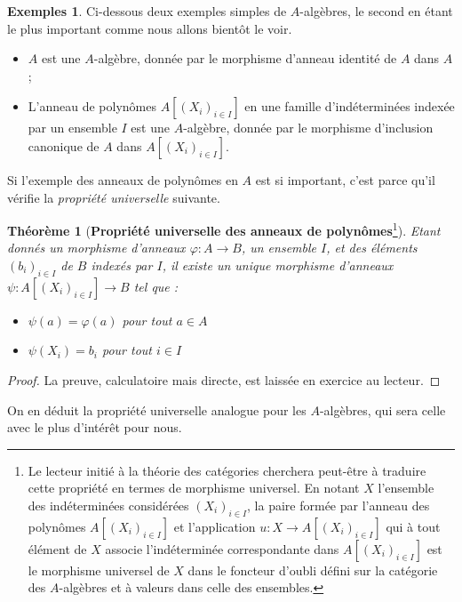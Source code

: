 \documentclass[10pt, twoside]{article}
\theoremstyle{plain}
\newtheorem{theorem}{Théorème}[section]
\theoremstyle{definition}
\theoremstyle{plain}
\theoremstyle{plain}
\theoremstyle{definition}
\newtheorem*{example}{Exemples}
\theoremstyle{remark}
\begin{document}
\begin{example} 
Ci-dessous deux exemples simples de $A$-algèbres, le second en étant le plus important comme nous allons bientôt le voir.
    \begin{itemize}
        \item $A$ est une $A$-algèbre, donnée par le morphisme d'anneau identité de $A$ dans $A$;
        \item L'anneau de polynômes $A[(X_i)_{i \in I}]$ en une famille d'indéterminées indexée par un ensemble $I$ est une $A$-algèbre, donnée par le morphisme d'inclusion canonique de $A$ dans $A[(X_i)_{i \in I}]$.
    \end{itemize}  
\end{example}

Si l'exemple des anneaux de polynômes en $A$ est si important, c'est parce qu'il vérifie la \textit{propriété universelle} suivante.

\begin{theorem}[\textbf{Propriété universelle des anneaux de polynômes}\footnote{Le lecteur initié à la théorie des catégories cherchera peut-être à traduire cette propriété en termes de morphisme universel. En notant $X$ l'ensemble des indéterminées considérées $(X_i)_{i \in I}$, la paire formée par l'anneau des polynômes $A[(X_i)_{i \in I}]$ et l'application $u : X \longrightarrow A[(X_i)_{i \in I}]$ qui à tout élément de $X$ associe l'indéterminée correspondante dans $A[(X_i)_{i \in I}]$ est le morphisme universel de $X$ dans le foncteur d'oubli défini sur la catégorie des $A$-algèbres et à valeurs dans celle des ensembles.}]\label{thm:prop univ ann poly}
    Etant donnés un morphisme d'anneaux $\varphi : A \longrightarrow B$, un ensemble $I$, et des éléments $(b_i)_{i \in I}$ de $B$ indexés par $I$, il existe un unique morphisme d'anneaux $\psi : A[(X_i)_{i \in I}] \longrightarrow B$ tel que :
    \begin{itemize}
        \item $\psi(a) = \varphi(a)$ pour tout $a \in A$
        \item $\psi(X_i) = b_i$ pour tout $i \in I$
    \end{itemize}
\end{theorem}

\begin{proof}
    La preuve, calculatoire mais directe, est laissée en exercice au lecteur. 
\end{proof}

On en déduit la propriété universelle analogue pour les $A$-algèbres, qui sera celle avec le plus d'intérêt pour nous.
\end{document}
